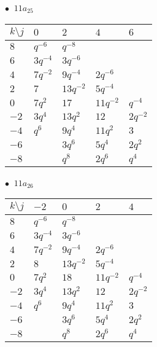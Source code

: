 \begin{minipage}{\linewidth}
$\bullet\ $ $11a_{25}$ \vspace{0.5em} \\
\begin{tabular}{l|llll}
$k \setminus j$ & $0$ & $2$ & $4$ & $6$ \\
\hline
$8$ & $q^{-6}$ & $q^{-8}$ &  &  \\
$6$ & $3q^{-4}$ & $3q^{-6}$ &  &  \\
$4$ & $7q^{-2}$ & $9q^{-4}$ & $2q^{-6}$ &  \\
$2$ & $7$ & $13q^{-2}$ & $5q^{-4}$ &  \\
$0$ & $7q^{2}$ & $17$ & $11q^{-2}$ & $q^{-4}$ \\
$-2$ & $3q^{4}$ & $13q^{2}$ & $12$ & $2q^{-2}$ \\
$-4$ & $q^{6}$ & $9q^{4}$ & $11q^{2}$ & $3$ \\
$-6$ &  & $3q^{6}$ & $5q^{4}$ & $2q^{2}$ \\
$-8$ &  & $q^{8}$ & $2q^{6}$ & $q^{4}$ \\
\end{tabular}
\vspace{2em}
\end{minipage}
%
\begin{minipage}{\linewidth}
$\bullet\ $ $11a_{26}$ \vspace{0.5em} \\
\begin{tabular}{l|llll}
$k \setminus j$ & $-2$ & $0$ & $2$ & $4$ \\
\hline
$8$ & $q^{-6}$ & $q^{-8}$ &  &  \\
$6$ & $3q^{-4}$ & $3q^{-6}$ &  &  \\
$4$ & $7q^{-2}$ & $9q^{-4}$ & $2q^{-6}$ &  \\
$2$ & $8$ & $13q^{-2}$ & $5q^{-4}$ &  \\
$0$ & $7q^{2}$ & $18$ & $11q^{-2}$ & $q^{-4}$ \\
$-2$ & $3q^{4}$ & $13q^{2}$ & $12$ & $2q^{-2}$ \\
$-4$ & $q^{6}$ & $9q^{4}$ & $11q^{2}$ & $3$ \\
$-6$ &  & $3q^{6}$ & $5q^{4}$ & $2q^{2}$ \\
$-8$ &  & $q^{8}$ & $2q^{6}$ & $q^{4}$ \\
\end{tabular}
\vspace{2em}
\end{minipage}
%
